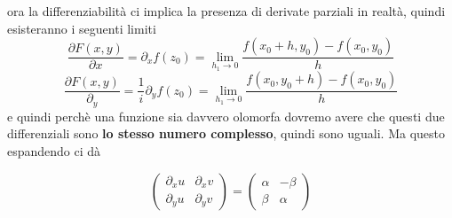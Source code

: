 \documentclass[11pt]{scrartcl}
\begin{document}
	ora la differenziabilità ci implica la presenza di derivate parziali in realtà, quindi esisteranno i seguenti limiti
	$$\frac{\partial F(x,y)}{\partial x}=\partial_x f(z_0)=\lim_{h_1\to 0}\frac{f(x_0+h,y_0)-f(x_0,y_0)}{h}$$
	$$\frac{\partial F(x,y)}{\partial_y}=\frac{1}{i}\partial_y f(z_0)=\lim_{h_1\to 0}\frac{f(x_0,y_0+h)-f(x_0,y_0)}{h}$$
	e quindi perchè una funzione sia davvero olomorfa dovremo avere che questi due differenziali sono \textbf{lo stesso numero complesso}, quindi sono uguali. Ma questo espandendo ci dà
	\begin{theorem}
		$$\begin{pmatrix}
			\partial_x u & \partial_x v \\
			\partial_y u & \partial_y v  
		\end{pmatrix}=
		\begin{pmatrix}
			\alpha & -\beta \\
			\beta & \alpha
		\end{pmatrix}$$
	\end{theorem}
\end{document}
